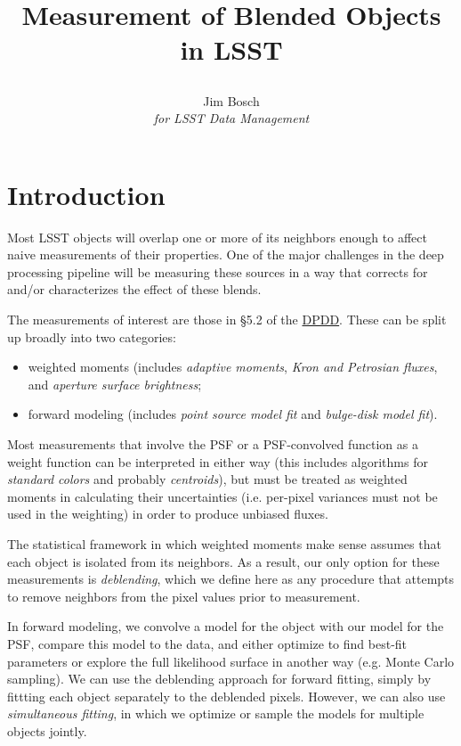 \documentclass[10pt]{article}
\title{Measurement of Blended Objects in LSST\\
{\author{
    Jim Bosch\\
    {\em for LSST Data Management}
}}}
\newcommand{\ds}[2]{{\color{blue} \href{https://docushare.lsstcorp.org/docushare/dsweb/Get/#1}{#2}}\xspace}
\newcommand{\DPDD}{\ds{LSE-163}{DPDD}}
\begin{document}
\maketitle

\section{Introduction}

Most LSST objects will overlap one or more of its neighbors enough to affect
naive measurements of their properties.  One of the major challenges in the
deep processing pipeline will be measuring these sources in a way that
corrects for and/or characterizes the effect of these blends.

The measurements of interest are those in \S 5.2 of the \DPDD.  These can be
split up broadly into two categories:
\begin{itemize}
    \item weighted moments (includes \textit{adaptive moments},
          \textit{Kron and Petrosian fluxes}, and
          \textit{aperture surface brightness};
    \item forward modeling (includes \textit{point source model fit} and
          \textit{bulge-disk model fit}).
\end{itemize}

Most measurements that involve the PSF or a PSF-convolved function as a weight
function can be interpreted in either way (this includes algorithms for
\textit{standard colors} and probably \textit{centroids}), but must be treated
as weighted moments in calculating their uncertainties (i.e. per-pixel
variances must not be used in the weighting) in order to produce unbiased
fluxes.

The statistical framework in which weighted moments make sense assumes that
each object is isolated from its neighbors.  As a result, our only option for
these measurements is {\em deblending}, which we define here as any
procedure that attempts to remove neighbors from the pixel values prior to
measurement.

In forward modeling, we convolve a model for the object with our model for
the PSF, compare this model to the data, and either optimize to find
best-fit parameters or explore the full likelihood surface in another way
(e.g. Monte Carlo sampling).  We can use the deblending approach for
forward fitting, simply by fittting each object separately to the deblended
pixels.  However, we can also use {\em simultaneous fitting}, in which we
optimize or sample the models for multiple objects jointly.
\end{document}
